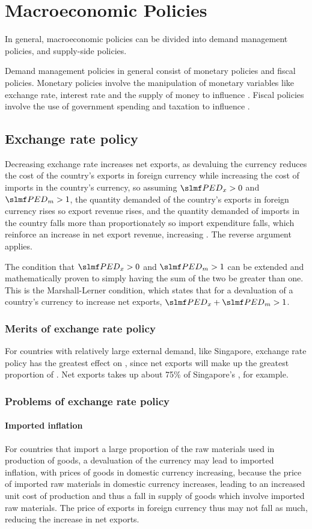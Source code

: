 \documentclass[Economics.tex]{subfiles}
\begin{document}
\chapter{Macroeconomic Policies}
In general, macroeconomic policies can be divided into demand management policies, and supply-side policies.

Demand management policies in general consist of monetary policies and fiscal policies. Monetary policies involve the manipulation of monetary variables like exchange rate, interest rate and the supply of money to influence \AD{}. Fiscal policies involve the use of government spending and taxation to influence \AD{}.
\section{Exchange rate policy}
Decreasing exchange rate increases net exports, as devaluing the currency reduces the cost of the country's exports in foreign currency while increasing the cost of imports in the country's currency, so assuming \(\PEDx{} > 0\) and \(\PEDm{} > 1\), the quantity demanded of the country's exports in foreign currency rises so export revenue rises, and the quantity demanded of imports in the country falls more than proportionately so import expenditure falls, which reinforce an increase in net export revenue, increasing \AD{}. The reverse argument applies.

The condition that \(\PEDx{} > 0\) and \(\PEDm{} > 1\) can be extended and mathematically proven to simply having the sum of the two be greater than one. This is the Marshall-Lerner condition, which states that for a devaluation of a country's currency to increase net exports, \(\PEDx{} + \PEDm{} > 1\).
\subsection{Merits of exchange rate policy}
For countries with relatively large external demand, like Singapore, exchange rate policy has the greatest effect on \AD{}, since net exports will make up the greatest proportion of \AD{}. Net exports takes up about 75\% of Singapore's \AD{}, for example.
\subsection{Problems of exchange rate policy}
\subsubsection{Imported inflation}
For countries that import a large proportion of the raw materials used in production of goods, a devaluation of the currency may lead to imported inflation, with prices of goods in domestic currency increasing, because the price of imported raw materials in domestic currency increases, leading to an increased unit cost of production and thus a fall in supply of goods which involve imported raw materials. The price of exports in foreign currency thus may not fall as much, reducing the increase in net exports.
\end{document}
